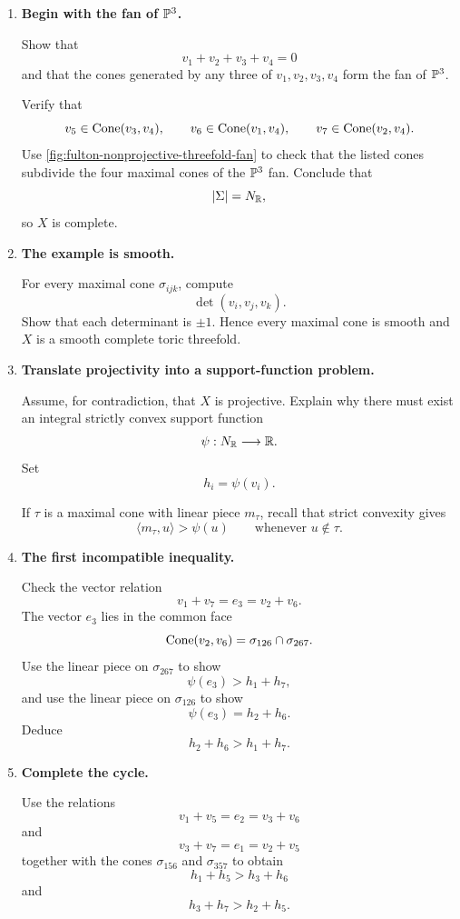 \clearpage
\begin{enumerate}[label=\textbf{Hint \arabic*.},wide=0pt]

\item \textbf{Begin with the fan of \(\mathbb{P}^3\).}

Show that
\[
v_1+v_2+v_3+v_4=0
\]
and that the cones generated by any three of
\(v_1,v_2,v_3,v_4\) form the fan of \(\mathbb{P}^3\).

Verify that
\[
v_5\in\operatorname{Cone}(v_3,v_4),
\qquad
v_6\in\operatorname{Cone}(v_1,v_4),
\qquad
v_7\in\operatorname{Cone}(v_2,v_4).
\]
Use \cref{fig:fulton-nonprojective-threefold-fan} to check that the
listed cones subdivide the four maximal cones of the \(\mathbb{P}^3\) fan.
Conclude that
\[
|\Sigma|=N_{\mathbb{R}},
\]
so \(X\) is complete.

\item \textbf{The example is smooth.}

For every maximal cone \(\sigma_{ijk}\), compute
\[
\det(v_i,v_j,v_k).
\]
Show that each determinant is \(\pm1\). Hence every maximal cone is
smooth and \(X\) is a smooth complete toric threefold.

\item \textbf{Translate projectivity into a support-function problem.}

Assume, for contradiction, that \(X\) is projective. Explain why there
must exist an integral strictly convex support function
\[
\psi:N_{\mathbb{R}}\longrightarrow\mathbb{R}.
\]
Set
\[
h_i=\psi(v_i).
\]

If \(\tau\) is a maximal cone with linear piece \(m_\tau\), recall
that strict convexity gives
\[
\langle m_\tau,u\rangle>\psi(u)
\qquad
\text{whenever }u\notin\tau.
\]

\item \textbf{The first incompatible inequality.}

Check the vector relation
\[
v_1+v_7=e_3=v_2+v_6.
\]
The vector \(e_3\) lies in the common face
\[
\operatorname{Cone}(v_2,v_6)
=
\sigma_{126}\cap\sigma_{267}.
\]
Use the linear piece on \(\sigma_{267}\) to show
\[
\psi(e_3)>h_1+h_7,
\]
and use the linear piece on \(\sigma_{126}\) to show
\[
\psi(e_3)=h_2+h_6.
\]
Deduce
\[
\boxed{h_2+h_6>h_1+h_7.}
\]

\item \textbf{Complete the cycle.}

Use the relations
\[
v_1+v_5=e_2=v_3+v_6
\]
and
\[
v_3+v_7=e_1=v_2+v_5
\]
together with the cones \(\sigma_{156}\) and \(\sigma_{357}\) to
obtain
\[
\boxed{h_1+h_5>h_3+h_6}
\]
and
\[
\boxed{h_3+h_7>h_2+h_5.}
\]


\end{enumerate}
